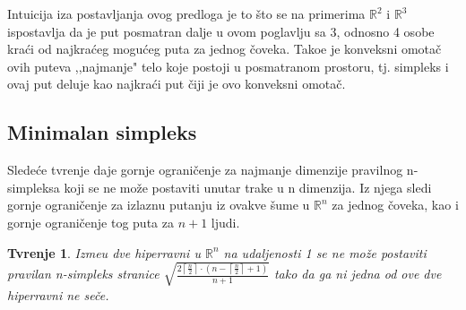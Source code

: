\documentclass[11pt,letter]{article}
\newtheorem{tvr}[teo]{\bf Tvr\dj enje}
\begin{document}
\indent Intuicija iza postavljanja ovog predloga je to \v sto se na primerima $\mathbb{R}^2$ i $\mathbb{R}^3$ ispostavlja da je put posmatran dalje u ovom poglavlju sa 3, odnosno 4 osobe kra\' ci od najkra\' ceg mogu\' ceg puta za jednog \v coveka. Tako\dj e je konveksni omota\v c ovih puteva ,,najmanje" telo koje postoji u posmatranom prostoru, tj. simpleks i ovaj put deluje kao najkra\' ci put \v ciji je ovo konveksni omota\v c.


\smallskip
\subsection[Minimalan simpleks]{Minimalan simpleks}
\bigskip

\indent Slede\' ce tvr\dj enje daje gornje ograni\v cenje za najmanje dimenzije pravilnog n-simpleksa koji se ne mo\v ze postaviti unutar trake u n dimenzija. Iz njega sledi gornje ograni\v cenje za izlaznu putanju iz ovakve \v sume u $\mathbb{R}^n$ za jednog \v coveka, kao i gornje ograni\v cenje tog puta za $n+1$ ljudi. 
\smallskip

\begin{tvr} Izme\dj u dve hiperravni u $\mathbb{R}^n$ na udaljenosti 1 se ne mo\v ze postaviti pravilan n-simpleks stranice $\sqrt{\frac{2\left\lceil \frac{n}{2}\right\rceil\cdot \left( n-\left\lceil\frac{n}{2}\right\rceil+1\right)}{n+1}}$ tako da ga ni jedna od ove dve hiperravni ne se\v ce.
\end{tvr}
\end{document}
